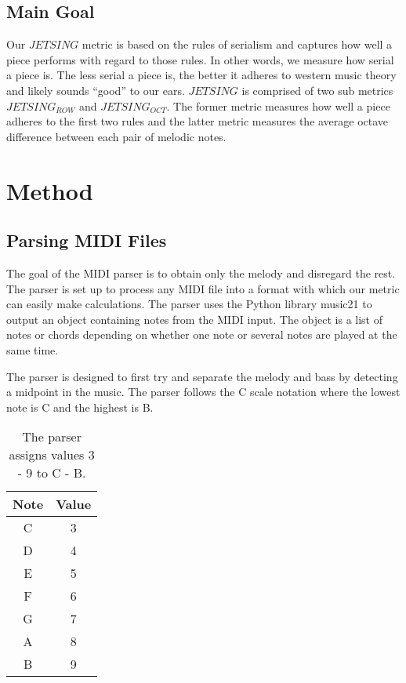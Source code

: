 \documentclass[11pt]{article}
\begin{document}
\subsection{Main Goal}

Our $JETSING$ metric is based on the rules of serialism and captures how well a piece performs with regard to those rules.
In other words, we measure how serial a piece is.
The less serial a piece is, the better it adheres to western music theory and likely sounds “good” to our ears.
$JETSING$ is comprised of two sub metrics $JETSING_{ROW}$ and $JETSING_{OCT}$.
The former metric measures how well a piece adheres to the first two rules and the latter metric measures the average octave difference between each pair of melodic notes.

\section{Method}
\subsection{Parsing MIDI Files}

The goal of the MIDI parser is to obtain only the melody and disregard the rest.
The parser is set up to process any MIDI file into a format with which our metric can easily make calculations.
The parser uses the Python library music21 to output an object containing notes from the MIDI input.
The object is a list of notes or chords depending on whether one note or several notes are played at the same time.

The parser is designed to first try and separate the melody and bass by detecting a midpoint in the music.
The parser follows the C scale notation where the lowest note is C and the highest is B.

\begin{table}
    \centering
    \begin{tabular}{c c}
        \hline
        Note & Value \\
        \hline
        C & 3 \\
        \hline
        D & 4 \\
        \hline
        E & 5 \\
        \hline
        F & 6 \\
        \hline
        G & 7 \\
        \hline
        A & 8 \\
        \hline
        B & 9 \\
        \hline
    \end{tabular}
    \caption{The parser assigns values 3 - 9 to C - B.}
\end{table}
\end{document}
